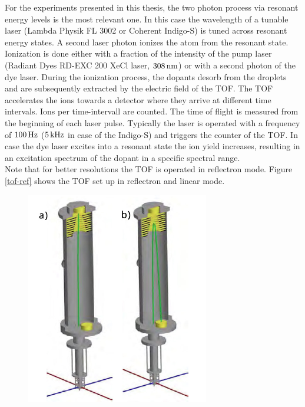 \documentclass[parskip,12pt,headsepline,a4paper] {scrbook}
\begin{document}
For the experiments presented in this thesis, the two photon process via resonant energy levels is the most relevant one. In this case the wavelength of a tunable laser (Lambda Physik FL 3002 or Coherent Indigo-S) is tuned across resonant energy states. A second laser photon ionizes the atom from the resonant state. Ionization is done either with a fraction of the intensity of the pump laser (Radiant Dyes RD-EXC 200 XeCl laser, $\unit[308]{nm}$) or with a second photon of the dye laser. During the ionization process, the dopants desorb from the droplets and are subsequently extracted by the electric field of the TOF. The TOF accelerates the ions towards a detector where they arrive at different time intervals. Ions per time-intervall are counted. The time of flight is measured from the beginning of each laser pulse. Typically the laser is operated with a frequency of $\unit[100]{Hz}$ ($\unit[5]{kHz}$ in case of the Indigo-S) and triggers the counter of the TOF. In case the dye laser excites into a resonant state the ion yield increases, resulting in an excitation spectrum of the dopant in a specific spectral range. \\
Note that for better resolutions the TOF is operated in reflectron mode. Figure \ref{tof-ref} shows the TOF set up in reflectron and linear mode. \\

\begin{figure}[ht]
\centerline{
\includegraphics[width=8cm]{./measuring_methods/tof-lin-ref.jpg}}
\end{figure}
\end{document}
